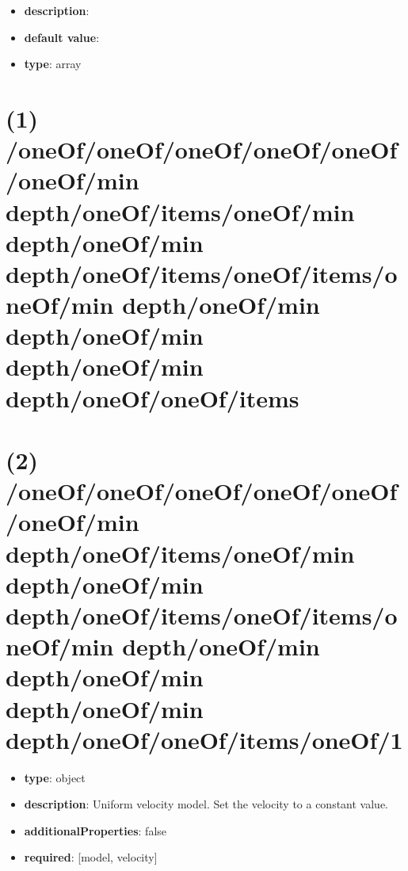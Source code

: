 \begin{itemize}[leftmargin=0em]\item {\bf description}: 
\item {\bf default value}: 
\item {\bf type}: array
\end{itemize}\section{(1) /oneOf/oneOf/oneOf/oneOf/oneOf/oneOf/min depth/oneOf/items/oneOf/min depth/oneOf/min depth/oneOf/items/oneOf/items/oneOf/min depth/oneOf/min depth/oneOf/min depth/oneOf/min depth/oneOf/oneOf/items}

\section{(2) /oneOf/oneOf/oneOf/oneOf/oneOf/oneOf/min depth/oneOf/items/oneOf/min depth/oneOf/min depth/oneOf/items/oneOf/items/oneOf/min depth/oneOf/min depth/oneOf/min depth/oneOf/min depth/oneOf/oneOf/items/oneOf/1}
\begin{itemize}[leftmargin=2em]\item {\bf type}: object
\item {\bf description}: Uniform velocity model. Set the velocity to a constant value.
\item {\bf additionalProperties}: false
\item {\bf required}: [model, velocity]\end{itemize}

